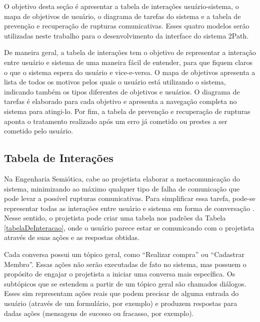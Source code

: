 \indent O objetivo desta seção é apresentar a tabela de interações usuário-sistema, o mapa de objetivos de usuário, o diagrama de tarefas do sistema e a tabela de prevenção e recuperação de rupturas comunicativas. Esses quatro modelos serão utilizadas neste trabalho para o desenvolvimento da interface do sistema 2Path. 

\indent De maneira geral, a tabela de interações tem o objetivo de representar a interação entre usuário e sistema de uma maneira fácil de entender, para que fiquem claros o que o sistema espera do usuário e vice-e-versa. O mapa de objetivos apresenta a lista de todos os motivos pelos quais o usuário está utilizando o sistema, indicando também os tipos diferentes de objetivos e usuários. O diagrama de tarefas é elaborado para cada objetivo e apresenta a navegação completa no sistema para atingi-lo. Por fim, a tabela de prevenção e recuperação de rupturas aponta o tratamento realizado após um erro já cometido ou prestes a ser cometido pelo usuário.

\subsection{Tabela de Interações}

\indent Na Engenharia Semiótica, cabe ao projetista elaborar a metacomunicação do sistema, minimizando ao máximo qualquer tipo de falha de comunicação que pode levar a possível rupturas comunicativas. Para simplificar essa tarefa, pode-se representar todas as interações entre usuário e sistema em forma de conversação \cite{IHCbook}. Nesse sentido, o projetista pode criar uma tabela nos padrões da Tabela \ref{tabelaDeInteracao}, onde o usuário parece estar se comunicando com o projetista através de suas ações e as respostas obtidas.

\indent Cada conversa possui um tópico geral, como ``Realizar compra'' ou ``Cadastrar Membro''. Essas ações não serão executadas de fato no sistema, mas possuem o propósito de engajar o projetista a iniciar uma conversa mais específica. Os subtópicos que se estendem a partir de um tópico geral são chamados diálogos. Esses sim representam ações reais que podem precisar de alguma entrada do usuário (através de um formulário, por exemplo) e produzem respostas para dadas ações (mensagens de sucesso ou fracasso, por exemplo).

